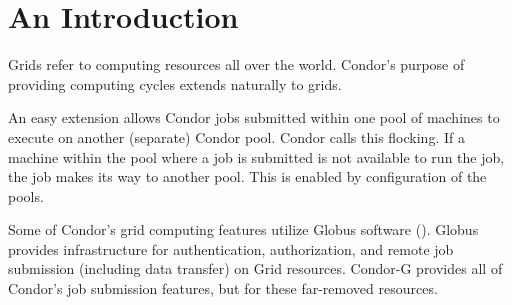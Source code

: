 \section{\label{sec:grids-intro}An Introduction}

Grids refer to computing resources all over the world. 
Condor's purpose of providing computing cycles extends naturally
to grids.

An easy extension allows Condor jobs submitted within one pool
of machines to execute on another (separate) Condor pool.
Condor calls this flocking.
If a machine within the pool where a job is submitted is not
available to run the job,
the job makes its way to another pool.
This is enabled by configuration of the pools.

Some of Condor's grid computing features utilize Globus software
().
Globus provides infrastructure for authentication, authorization,
and remote job submission (including data transfer) on Grid resources.
Condor-G provides all of Condor's job submission features,
but for these far-removed resources.
